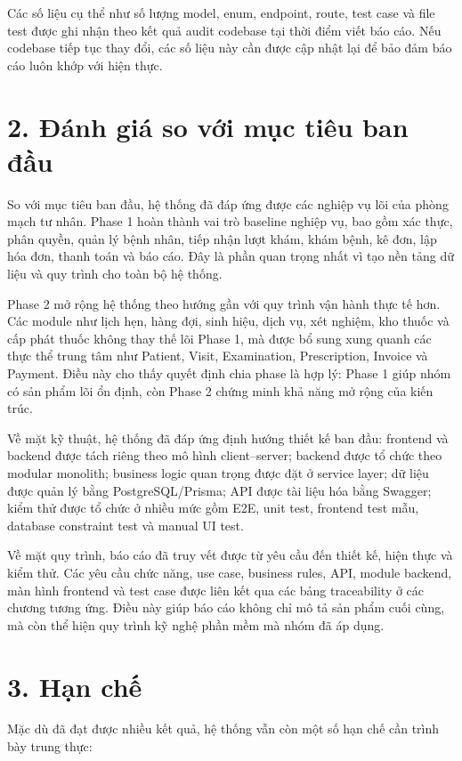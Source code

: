 Các số liệu cụ thể như số lượng model, enum, endpoint, route, test case và file test được ghi nhận theo kết quả audit codebase tại thời điểm viết báo cáo. Nếu codebase tiếp tục thay đổi, các số liệu này cần được cập nhật lại để bảo đảm báo cáo luôn khớp với hiện thực.

\section*{2. Đánh giá so với mục tiêu ban đầu}

So với mục tiêu ban đầu, hệ thống đã đáp ứng được các nghiệp vụ lõi của phòng mạch tư nhân. Phase 1 hoàn thành vai trò baseline nghiệp vụ, bao gồm xác thực, phân quyền, quản lý bệnh nhân, tiếp nhận lượt khám, khám bệnh, kê đơn, lập hóa đơn, thanh toán và báo cáo. Đây là phần quan trọng nhất vì tạo nền tảng dữ liệu và quy trình cho toàn bộ hệ thống.

Phase 2 mở rộng hệ thống theo hướng gần với quy trình vận hành thực tế hơn. Các module như lịch hẹn, hàng đợi, sinh hiệu, dịch vụ, xét nghiệm, kho thuốc và cấp phát thuốc không thay thế lõi Phase 1, mà được bổ sung xung quanh các thực thể trung tâm như Patient, Visit, Examination, Prescription, Invoice và Payment. Điều này cho thấy quyết định chia phase là hợp lý: Phase 1 giúp nhóm có sản phẩm lõi ổn định, còn Phase 2 chứng minh khả năng mở rộng của kiến trúc.

Về mặt kỹ thuật, hệ thống đã đáp ứng định hướng thiết kế ban đầu: frontend và backend được tách riêng theo mô hình client--server; backend được tổ chức theo modular monolith; business logic quan trọng được đặt ở service layer; dữ liệu được quản lý bằng PostgreSQL/Prisma; API được tài liệu hóa bằng Swagger; kiểm thử được tổ chức ở nhiều mức gồm E2E, unit test, frontend test mẫu, database constraint test và manual UI test.

Về mặt quy trình, báo cáo đã truy vết được từ yêu cầu đến thiết kế, hiện thực và kiểm thử. Các yêu cầu chức năng, use case, business rules, API, module backend, màn hình frontend và test case được liên kết qua các bảng traceability ở các chương tương ứng. Điều này giúp báo cáo không chỉ mô tả sản phẩm cuối cùng, mà còn thể hiện quy trình kỹ nghệ phần mềm mà nhóm đã áp dụng.

\section*{3. Hạn chế}

Mặc dù đã đạt được nhiều kết quả, hệ thống vẫn còn một số hạn chế cần trình bày trung thực:

